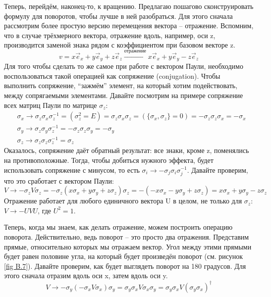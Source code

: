 Теперь, перейдём, наконец-то, к вращению. Предлагаю пошагово сконструировать формулу для поворотов, чтобы лучше в ней разобраться. Для этого сначала рассмотрим более простую версию перемещения вектора -- отражение. Вспомним, что в случае трёхмерного вектора, отражение вдоль, например, оси z, производится заменой знака рядом с коэффициентом при базовом векторе z.
\[
v = x\vec{e}_x + y\vec{e}_y + z\vec{e}_z\xrightarrow{\text{отражение}} x\vec{e}_x + y\vec{e}_y - z\vec{e}_z
\]
Для того чтобы сделать то же самое при работе с вектором Паули, необходимо воспользоваться такой операцией как сопряжение (conjugation). Чтобы выполнить сопряжение, ``зажмём'' элемент, на который хотим подействовать, между сопрягаемыми элементами. Давайте посмотрим на примере сопряжение всех матриц Паули по матрице $\sigma_z$:
\begin{align*}
&\sigma_x\rightarrow \sigma_z\sigma_x\sigma^{-1}_z = \left(\sigma_z^2 = E\right) = \sigma_z\sigma_x\sigma_z = \left(\{\sigma_x, \sigma_z\} = 0\right) = -\sigma_z\sigma_z\sigma_x = -\sigma_x\\
&\sigma_y\rightarrow \sigma_z\sigma_y\sigma_z^{-1} = -\sigma_z\sigma_z\sigma_y = -\sigma_y\\
&\sigma_z\rightarrow \sigma_z\sigma_z\sigma_z^{-1} = \sigma_z
\end{align*}
Оказалось, сопряжение даёт обратный результат: все знаки, кроме z, поменялись на противоположные. Тогда, чтобы добиться нужного эффекта, будет использовать сопряжение с минусом, то есть $\sigma_i \rightarrow -\sigma_j\sigma_i\sigma_j^{-1}$. Давайте проверим, что это сработает с вектором Паули:
\[
    V \rightarrow -\sigma_z V\sigma_z = -\sigma_z \left(x\sigma_x + y\sigma_y + z\sigma_z\right)\sigma_z = -(-x\sigma_x - y\sigma_y + z\sigma_z) = x\sigma_x + y\sigma_y - z\sigma_z
\]
Отражение работает для любого единичного вектора U в целом, не только для $\sigma_z$: $V \rightarrow -UVU$, где $U^2 = 1$.

Теперь, когда мы знаем, как делать отражение, можем построить операцию поворота. Действительно, ведь поворот -- это просто два отражения. Представим прямые, относительно которых мы отражаем вектор. Угол между этими прямыми будет равен половине угла, на который будет произведён поворот (см. рисунок \ref{fig B.7}). Давайте проверим, как будет выглядеть поворот на 180 градусов. Для этого сначала отразим вдоль оси x, затем вдоль оси y.
\[
V \rightarrow -\sigma_y\left(-\sigma_xV\sigma_x\right)\sigma_y = \sigma_y\sigma_xV\sigma_x\sigma_y = \sigma_y\sigma_xV(\sigma_y\sigma_x)^{\dagger}
\]

